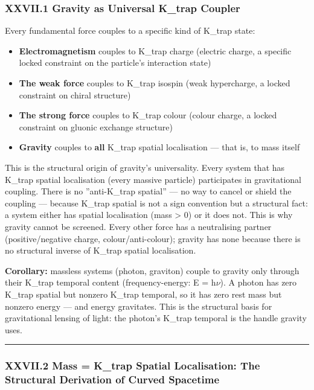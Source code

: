 \documentclass[12pt,a4paper]{article}
\begin{document}
\subsubsection{XXVII.1 Gravity as Universal K\_trap Coupler}

Every fundamental force couples to a specific kind of K\_trap state:

\begin{itemize}
    \item \textbf{Electromagnetism} couples to K\_trap charge (electric charge, a specific locked constraint on the particle's interaction state)
    \item \textbf{The weak force} couples to K\_trap isospin (weak hypercharge, a locked constraint on chiral structure)
    \item \textbf{The strong force} couples to K\_trap colour (colour charge, a locked constraint on gluonic exchange structure)
    \item \textbf{Gravity} couples to \textbf{all} K\_trap spatial localisation --- that is, to mass itself
\end{itemize}

This is the structural origin of gravity's universality. Every system that has K\_trap spatial localisation (every massive particle) participates in gravitational coupling. There is no ''anti-K\_trap spatial'' --- no way to cancel or shield the coupling --- because K\_trap spatial is not a sign convention but a structural fact: a system either has spatial localisation (mass \textgreater{} 0) or it does not. This is why gravity cannot be screened. Every other force has a neutralising partner (positive/negative charge, colour/anti-colour); gravity has none because there is no structural inverse of K\_trap spatial localisation.

\textbf{Corollary:} massless systems (photon, graviton) couple to gravity only through their K\_trap temporal content (frequency-energy: E = h$\nu$). A photon has zero K\_trap spatial but nonzero K\_trap temporal, so it has zero rest mass but nonzero energy --- and energy gravitates. This is the structural basis for gravitational lensing of light: the photon's K\_trap temporal is the handle gravity uses.

\begin{center}
\rule{0.5\textwidth}{0.4pt}
\end{center}

\subsubsection{XXVII.2 Mass = K\_trap Spatial Localisation: The Structural Derivation of Curved Spacetime}
\end{document}
